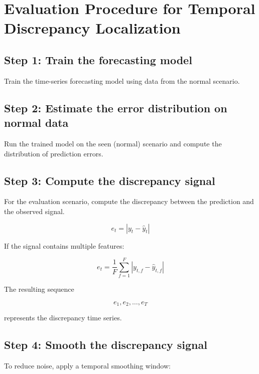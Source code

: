 \documentclass[a4paper]{article}
\title{}
\date{}
\begin{document}
    \maketitle
    
    
    \section{Evaluation Procedure for Temporal Discrepancy Localization}
        
        \subsection{Step 1: Train the forecasting model}
            Train the time-series forecasting model using data from the normal scenario.
        
        \subsection{Step 2: Estimate the error distribution on normal data}
            Run the trained model on the seen (normal) scenario and compute the distribution of prediction errors.
        
        \subsection{Step 3: Compute the discrepancy signal}
            For the evaluation scenario, compute the discrepancy between the prediction and the observed signal.
            
            \[
                e_t = |y_t - \hat{y}_t|
            \]
            
            If the signal contains multiple features:
            
            \[
                e_t = \frac{1}{F}\sum_{f=1}^{F} |y_{t,f} - \hat{y}_{t,f}|
            \]
            
            The resulting sequence
            
            \[
                e_1, e_2, \dots, e_T
            \]
            
            represents the discrepancy time series.
        
        \subsection{Step 4: Smooth the discrepancy signal}
            To reduce noise, apply a temporal smoothing window:
            
\end{document}
